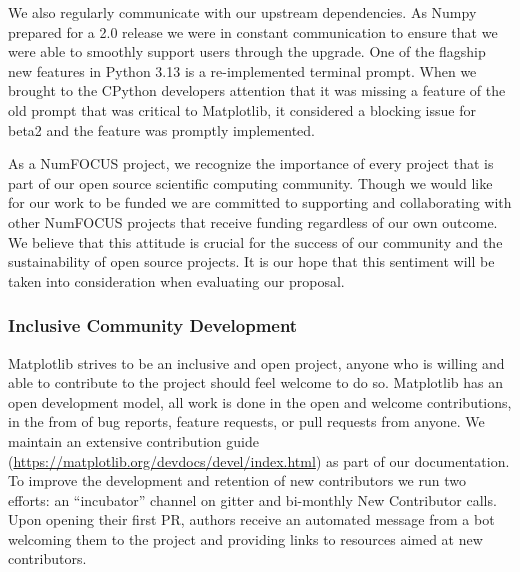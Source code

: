 \documentclass[12pt]{article}
\numberwithin{page}{section}
\begin{document}
We also regularly communicate with our upstream dependencies.  As Numpy
prepared for a 2.0 release we were in constant communication to ensure that we
were able to smoothly support users through the upgrade.  One of the flagship
new features in Python 3.13 is a re-implemented terminal prompt.  When we
brought to the CPython developers attention that it was missing a feature of
the old prompt that was critical to Matplotlib, it considered a blocking issue
for beta2 and the feature was promptly implemented.

As a NumFOCUS project, we recognize the importance of every project
that is part of our open source scientific computing community. Though
we would like for our work to be funded we are committed to supporting
and collaborating with other NumFOCUS projects that receive funding
regardless of our own outcome. We believe that this attitude is
crucial for the success of our community and the sustainability of
open source projects. It is our hope that this sentiment will be taken
into consideration when evaluating our proposal.


\subsubsection{Inclusive Community Development}
\label{sec:icd}

Matplotlib strives to be an inclusive and open project, anyone who is willing
and able to contribute to the project should feel welcome to do so.  Matplotlib
has an open development model, all work is done in the open and welcome
contributions, in the from of bug reports, feature requests, or pull requests
from anyone.  We maintain an extensive contribution guide
(\url{https://matplotlib.org/devdocs/devel/index.html}) as part of our
documentation.  To improve the development and retention of new contributors we
run two efforts: an ``incubator'' channel on gitter and bi-monthly New
Contributor calls.  Upon opening their first PR, authors receive an automated
message from a bot welcoming them to the project and providing links to
resources aimed at new contributors.
\end{document}
